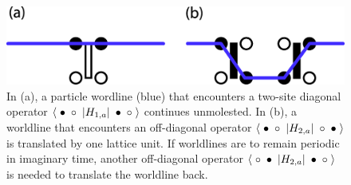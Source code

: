 \documentclass[vecphys]{svmult}
\begin{document}
\begin{figure}[t]
\centering
\includegraphics*[width=.7\textwidth]{diag_offdiag.eps}
\caption[]{In (a), a particle wordline (blue) that encounters a two-site diagonal operator $\langle \hspace{1mm} \bullet \hspace{1mm}  \circ \hspace{1mm}  | H_{1,a} | \hspace{1mm} \bullet \hspace{1mm} \circ \hspace{1mm} \rangle$ continues unmolested.  In (b), a worldline that encounters an off-diagonal operator $\langle \hspace{1mm} \bullet \hspace{1mm}  \circ \hspace{1mm}  | H_{2,a} | \hspace{1mm} \circ \hspace{1mm} \bullet \hspace{1mm} \rangle $ is translated by one lattice unit.  If worldlines are to remain periodic in imaginary time, another off-diagonal operator $\langle \hspace{1mm} \circ \hspace{1mm}  \bullet \hspace{1mm}  | H_{2,a} | \hspace{1mm} \bullet \hspace{1mm} \circ \hspace{1mm} \rangle$ is needed to translate the worldline back.}
\label{Melko:fig:1}      
\end{figure} 
\end{document}
